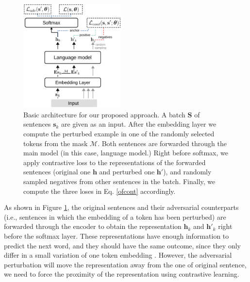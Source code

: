 \documentclass[letterpaper]{article} %
\begin{document}
\begin{figure}[ht]
    \centering
    \includegraphics[width=0.474\textwidth]{embed.pdf}
    \caption{Basic architecture for our proposed approach. A batch $\mathbf{S}$ of sentences $\mathbf{s}_k$ are given as an input. After the embedding layer we compute the perturbed example in one of the randomly selected tokens from the mask $\mathcal{M}$. Both sentences are forwarded through the main model (in this case, language model.) Right before softmax, we apply contrastive loss to the representations of the forwarded sentences (original one $\mathbf{h}$ and perturbed one $\mathbf{h'}$), and randomly sampled negatives from other sentences in the batch. Finally, we compute the three loses in Eq. \ref{ofcont} accordingly.}
	\label{fig:fig1}
\end{figure}

As shown in Figure \ref{fig:fig1}, the original sentences and their adversarial counterparts (i.e., sentences in which the embedding of a token has been perturbed) are forwarded 
through the encoder to obtain the representation $\mathbf{h}_{k}$ and $\mathbf{h}'_{k}$ right before the softmax layer. These representations have enough information to predict the next word, and they should have the same outcome, since they only differ in a small variation of one token embedding \cite{hahn-choi-2019-self}. However, the adversarial perturbation will move the representation away from the one of original sentence, we need to force the proximity of the representation using contrastive learning. 
\end{document}
